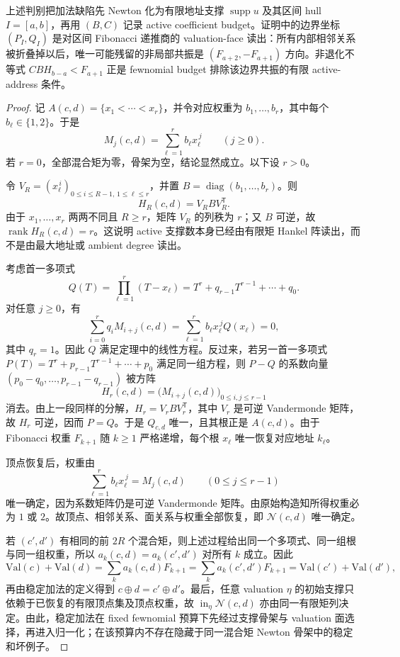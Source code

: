 \begin{remark}\label{distill:khovanskii_newton_polyhedra_fewnomials_and_tropical_skeletons-fewnomial_budget_bounds-operator-bridge}
上述判别把加法缺陷先 Newton 化为有限地址支撑 \(\operatorname{supp}u\) 及其区间 hull \(I=[a,b]\)，再用 \((B,C)\) 记录 active coefficient budget。证明中的边界坐标 \((P_I,Q_I)\) 是对区间 Fibonacci 递推商的 valuation-face 读出：所有内部相邻关系被折叠掉以后，唯一可能残留的非局部共振是 \((F_{a+2},-F_{a+1})\) 方向。非退化不等式 \(CBH_{b-a}<F_{a+1}\) 正是 fewnomial budget 排除该边界共振的有限 active-address 条件。
\end{remark}

\begin{proof}
记 \(A(c,d)=\{x_1<\cdots <x_r\}\)，并令对应权重为 \(b_1,\ldots,b_r\)，其中每个 \(b_\ell\in\{1,2\}\)。于是
\[
 M_j(c,d)=\sum_{\ell=1}^r b_\ell x_\ell^{\,j}\qquad(j\ge0).
\]
若 \(r=0\)，全部混合矩为零，骨架为空，结论显然成立。以下设 \(r>0\)。

令 \(V_R=(x_\ell^{\,i})_{0\le i\le R-1,\,1\le\ell\le r}\)，并置 \(B=\operatorname{diag}(b_1,\ldots,b_r)\)。则
\[
 H_R(c,d)=V_RBV_R^{\mathsf T}.
\]
由于 \(x_1,\ldots,x_r\) 两两不同且 \(R\ge r\)，矩阵 \(V_R\) 的列秩为 \(r\)；又 \(B\) 可逆，故 \(\operatorname{rank}H_R(c,d)=r\)。这说明 active 支撑数本身已经由有限矩 Hankel 阵读出，而不是由最大地址或 ambient degree 读出。

考虑首一多项式
\[
 Q(T)=\prod_{\ell=1}^r(T-x_\ell)=T^r+q_{r-1}T^{r-1}+\cdots+q_0.
\]
对任意 \(j\ge0\)，有
\[
 \sum_{i=0}^r q_iM_{i+j}(c,d)
 =\sum_{\ell=1}^r b_\ell x_\ell^{\,j}Q(x_\ell)=0,
\]
其中 \(q_r=1\)。因此 \(Q\) 满足定理中的线性方程。反过来，若另一首一多项式 \(P(T)=T^r+p_{r-1}T^{r-1}+\cdots+p_0\) 满足同一组方程，则 \(P-Q\) 的系数向量 \((p_0-q_0,\ldots,p_{r-1}-q_{r-1})\) 被方阵
\[
 H_r(c,d)=\bigl(M_{i+j}(c,d)\bigr)_{0\le i,j\le r-1}
\]
消去。由上一段同样的分解，\(H_r=V_rBV_r^{\mathsf T}\)，其中 \(V_r\) 是可逆 Vandermonde 矩阵，故 \(H_r\) 可逆，因而 \(P=Q\)。于是 \(Q_{c,d}\) 唯一，且其根正是 \(A(c,d)\)。由于 Fibonacci 权重 \(F_{k+1}\) 随 \(k\ge1\) 严格递增，每个根 \(x_\ell\) 唯一恢复对应地址 \(k_\ell\)。

顶点恢复后，权重由
\[
 \sum_{\ell=1}^r b_\ell x_\ell^{\,j}=M_j(c,d)\qquad(0\le j\le r-1)
\]
唯一确定，因为系数矩阵仍是可逆 Vandermonde 矩阵。由原始构造知所得权重必为 \(1\) 或 \(2\)。故顶点、相邻关系、面关系与权重全部恢复，即 \(\mathcal N(c,d)\) 唯一确定。

若 \((c',d')\) 有相同的前 \(2R\) 个混合矩，则上述过程给出同一个多项式、同一组根与同一组权重，所以 \(a_k(c,d)=a_k(c',d')\) 对所有 \(k\) 成立。因此
\[
 \mathrm{Val}(c)+\mathrm{Val}(d)=\sum_k a_k(c,d)F_{k+1}
 =\sum_k a_k(c',d')F_{k+1}
 =\mathrm{Val}(c')+\mathrm{Val}(d'),
\]
再由稳定加法的定义得到 \(c\oplus d=c'\oplus d'\)。最后，任意 valuation \(\eta\) 的初始支撑只依赖于已恢复的有限顶点集及顶点权重，故 \(\operatorname{in}_\eta\mathcal N(c,d)\) 亦由同一有限矩列决定。由此，稳定加法在 fixed fewnomial 预算下先经过支撑骨架与 valuation 面选择，再进入归一化；在该预算内不存在隐藏于同一混合矩 Newton 骨架中的稳定和坏例子。
\end{proof}

